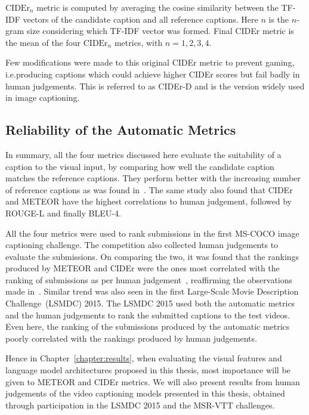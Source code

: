 $\text{CIDEr}_n$ metric is computed by averaging the cosine similarity between
the TF-IDF vectors of the candidate caption and all reference captions.
Here $n$ is the $n$-gram size considering which TF-IDF vector was formed.
Final CIDEr metric is the mean of the four $\text{CIDEr}_n$ metrics, with $n=1,2,3,4$.

Few modifications were made to this original CIDEr metric to prevent gaming,
i.e.\@ producing captions which could achieve higher CIDEr scores but fail badly
in human judgements.
This is referred to as CIDEr-D and is the version widely used in image
captioning.

\subsection{Reliability of the Automatic Metrics}
\label{subsec:autMetRel}
In summary, all the four metrics discussed here evaluate the suitability of a
caption to the visual input, by comparing how well the candidate caption
matches the reference captions.
They perform better with the increasing number of reference captions as was
found in~\cite{Vedantam_2015_CVPR}.
The same study also found that CIDEr and METEOR have the highest correlations
to human judgement, followed by ROUGE-L and finally BLEU-4.

All the four metrics were used to rank submissions in the first MS-COCO
image captioning challenge.
The competition also collected human judgements to evaluate the submissions.
%
On comparing the two, it was found that the rankings produced by METEOR and
CIDEr were the ones most correlated with the ranking of submissions as per human
judgement~\cite{lsun2015CaptionSlides}, reaffirming the observations made
in~\cite{Vedantam_2015_CVPR}.
Similar trend was also seen in the first Large-Scale Movie Description
Challenge~(LSMDC) 2015.
The LSMDC 2015 used both the automatic metrics and the human judgements
to rank the submitted captions to the test videos.
Even here, the ranking of the submissions produced by the automatic metrics
poorly correlated with the rankings produced by human judgements.

Hence in Chapter~\ref{chapter:results}, when evaluating the visual features and
language model architectures proposed in this thesis, most importance will be
given to METEOR and CIDEr metrics.
We will also present results from human judgements of the video captioning
models presented in this thesis, obtained through participation in the LSMDC
2015 and the MSR-VTT challenges.

